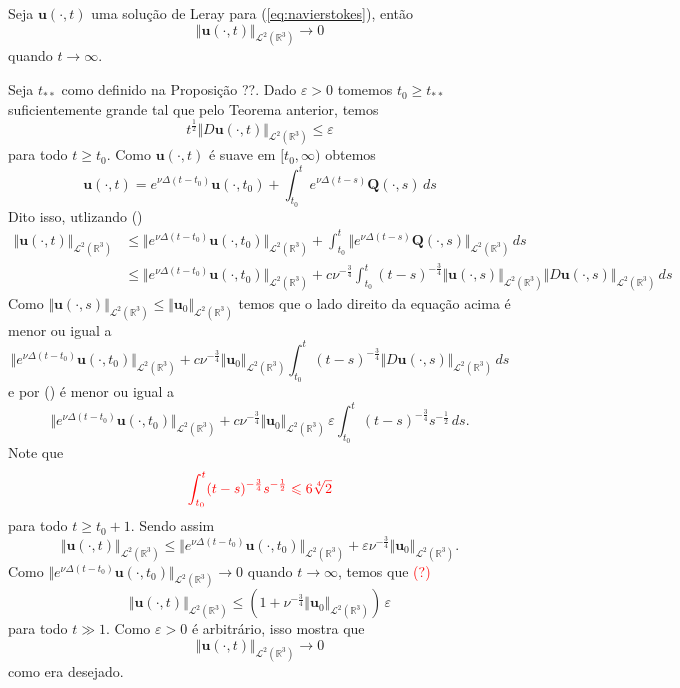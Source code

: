 \documentclass[a4paper, 11pt]{book}
\theoremstyle{definition}
\newcommand{\bR}{\mathbb{R}}
\newcommand{\bu}{\mathbf{u}}
\newcommand{\BQ}{\mathbf{Q}}
\newcommand{\cL}{\mathcal{L}}
\begin{document}
\begin{tbox} \label{thm:problema-leray}
    Seja $\bu(\cdot,t)$ uma solução de Leray para (\ref{eq:navierstokes}), então
    \[
        \Vert \bu(\cdot,t) \Vert_{\cL^2(\bR^3)}\to 0
    \]
    quando $t \to \infty$.
\end{tbox}
\begin{prf}
    Seja $t_{**}$ como definido na Proposição ??.
    Dado $\varepsilon > 0$ tomemos $t_0 \geqslant t_{**}$ suficientemente grande tal que pelo Teorema anterior, temos
    \[
        t^{\frac{1}{2}} \Vert D\bu(\cdot,t) \Vert_{\cL^2(\bR^3)} \leqslant \varepsilon
    \]
    para todo $t \geqslant t_0$.
    Como $\bu(\cdot,t)$ é suave em $[t_0,\infty)$ obtemos
    \[
        \bu(\cdot,t) = e^{\nu\Delta(t - t_0)} \bu(\cdot,t_0) + \int_{t_0}^{t} e^{\nu\Delta(t-s)}\BQ(\cdot,s) \, ds
    \]
    Dito isso, utlizando ()
    \[
        \begin{aligned}
            \Vert \bu(\cdot,t) \Vert_{\cL^2(\bR^3)} &\leqslant \Vert e^{\nu\Delta(t - t_0)} \bu(\cdot,t_0) \Vert_{\cL^2(\bR^3)} + \int_{t_0}^t \Vert e^{\nu\Delta(t-s)} \BQ(\cdot,s) \Vert_{\cL^2(\bR^3)}\,ds\\
            &\leqslant \Vert e^{\nu\Delta(t - t_0)} \bu(\cdot,t_0) \Vert_{\cL^2(\bR^3)} + c \nu^{-\frac{3}{4}} \int_{t_0}^t (t - s)^{-\frac{3}{4}} \Vert \bu(\cdot,s) \Vert_{\cL^2(\bR^3)} \Vert D\bu(\cdot,s) \Vert_{\cL^2(\bR^3)} \,ds
        \end{aligned}
    \]
    Como $\Vert \bu(\cdot,s) \Vert_{\cL^2(\bR^3)} \leqslant \Vert \bu_{0} \Vert_{\cL^2(\bR^3)}$ temos que o lado direito da equação acima é menor ou igual a
    \[
        \Vert e^{\nu\Delta(t - t_0)} \bu(\cdot,t_0) \Vert_{\cL^2(\bR^3)} + c \nu^{-\frac{3}{4}} \Vert \bu_0 \Vert_{\cL^2(\bR^3)} \int_{t_0}^t (t - s)^{-\frac{3}{4}}\Vert D\bu(\cdot,s) \Vert_{\cL^2(\bR^3)} \,ds
    \]
    e por () é menor ou igual a
    \[
        \Vert e^{\nu\Delta(t - t_0)} \bu(\cdot,t_0) \Vert_{\cL^2(\bR^3)} + c \nu^{-\frac{3}{4}} \Vert \bu_0 \Vert_{\cL^2(\bR^3)}\, \varepsilon \! \int_{t_0}^t (t - s)^{-\frac{3}{4}} s^{-\frac{1}{2}} \,ds.
    \]
    Note que
    \[
        \textcolor{red}{\int_{t_0}^t (t - s)^{-\frac{3}{4}}s^{-\frac{1}{2}} \leqslant 6\sqrt[4]{2}}
    \]
    para todo $t \geqslant t_0 + 1$. Sendo assim
    \[
        \Vert \bu(\cdot,t) \Vert_{\cL^2(\bR^3)} \leqslant \Vert e^{\nu\Delta(t - t_0)} \bu(\cdot,t_0) \Vert_{\cL^2(\bR^3)} + \varepsilon\nu^{-\frac{3}{4}} \Vert \bu_0 \Vert_{\cL^2(\bR^3)}.
    \]
    Como $\Vert e^{\nu\Delta(t-t_0)} \bu(\cdot,t_0) \Vert_{\cL^2(\bR^3)} \to 0$ quando $t \to \infty$, temos que \textcolor{red}{(?)}
    \[
        \Vert \bu(\cdot,t) \Vert_{\cL^2(\bR^3)} \leqslant (1 +  \nu^{-\frac{3}{4}} \Vert \bu_0 \Vert_{\cL^2(\bR^3)}) \,\varepsilon
    \]
    para todo $t \gg 1$.
    Como $\varepsilon > 0$ é arbitrário, isso mostra que
    \[
        \Vert \bu(\cdot,t) \Vert_{\cL^2(\bR^3)} \to 0
    \]
    como era desejado.
\end{prf}
\end{document}
